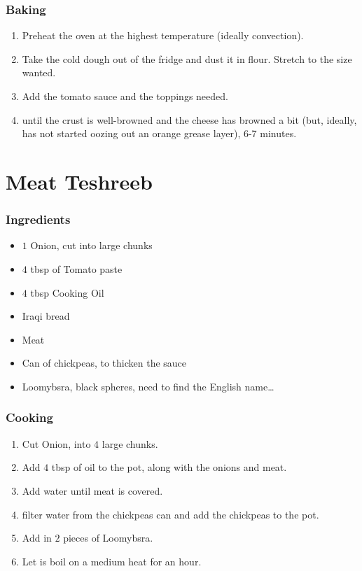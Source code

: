 \subsubsection{Baking}
\begin{enumerate}
    \item Preheat the oven at the highest temperature (ideally convection).
    \item Take the cold dough out of the fridge and dust it in flour. Stretch to the size wanted.
    \item Add the tomato sauce and the toppings needed.
    \item until the crust is well-browned and the cheese has browned a bit (but, ideally, has not started oozing out an orange grease layer), 6-7 minutes.
\end{enumerate}

\section{Meat Teshreeb}
\subsubsection{Ingredients}
\begin{itemize}
    \item $1$ Onion, cut into large chunks
    \item $4$ tbsp of Tomato paste
    \item $4$ tbsp Cooking Oil
    \item Iraqi bread
    \item Meat
    \item Can of chickpeas, to thicken the sauce
    \item Loomybsra, black spheres, need to find the English name\ldots
\end{itemize}

\subsubsection{Cooking}
\begin{enumerate}
    \item Cut Onion, into $4$ large chunks.
    \item Add $4$ tbsp of oil to the pot, along with the onions and meat.
    \item Add water until meat is covered.
    \item filter water from the chickpeas can and add the chickpeas to the pot.
    \item Add in $2$ pieces of Loomybsra.
    \item Let is boil on a medium heat for an hour.
\end{enumerate}
